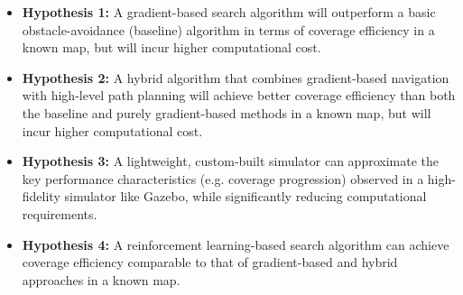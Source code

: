\begin{itemize}
    \item \textbf{Hypothesis 1:} A gradient-based search algorithm will outperform a basic obstacle-avoidance (baseline) algorithm in terms of coverage efficiency in a known map, but will incur higher computational cost.
    \item \textbf{Hypothesis 2:} A hybrid algorithm that combines gradient-based navigation with high-level path planning will achieve better coverage efficiency than both the baseline and purely gradient-based methods in a known map, but will incur higher computational cost.
    \item \textbf{Hypothesis 3:} A lightweight, custom-built simulator can approximate the key performance characteristics (e.g. coverage progression) observed in a high-fidelity simulator like Gazebo, while significantly reducing computational requirements.
    \item {\color{red}\textbf{Hypothesis 4:} A reinforcement learning-based search algorithm can achieve coverage efficiency comparable to that of gradient-based and hybrid approaches in a known map.}
\end{itemize}
